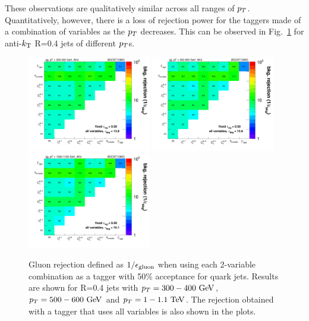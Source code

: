 These observations are qualitatively similar across all ranges of $p_T$. Quantitatively, however,
there is a loss of rejection power for the taggers made of a combination of variables as the $p_T$ decreases. 
This can be observed in Fig.~\ref{fig:qg_akt4_comb} for anti-$k_{\mathrm{T}}$ R=0.4 jets of different $p_T$s. 
\begin{figure}
\begin{center}
\includegraphics[width=0.48\textwidth]{./Figures/QGTagging/pT300/AKtR04/effBkg2D.png}
\includegraphics[width=0.48\textwidth]{./Figures/QGTagging/pT500/AKtR04/effBkg2D.png}
\includegraphics[width=0.48\textwidth]{./Figures/QGTagging/pT1000/AKtR04/effBkg2D.png}
\caption{Gluon rejection defined as $1/\epsilon_{\rm gluon}$ when using each 2-variable combination 
as a tagger with 50\% acceptance for quark jets. Results are shown for R=0.4 jets with $\pt=300-400 \GeV$, 
$\pt=500-600 \GeV$ and $\pt=1-1.1 \TeV$. The rejection obtained with a tagger that uses all variables is also shown
in the plots. }
\label{fig:qg_akt4_comb}
\end{center}
\end{figure}
